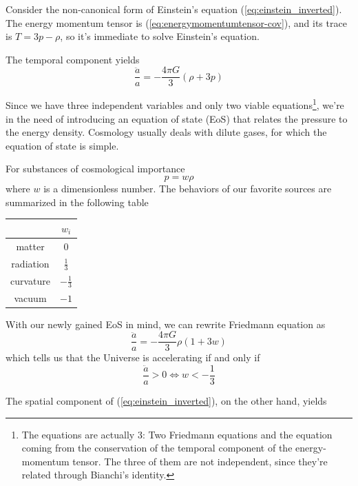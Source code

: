 Consider the non-canonical form of Einstein's equation (\ref{eq:einstein_inverted}). The energy momentum tensor is (\ref{eq:energymomentumtensor-cov}), and its trace is $T = 3p - \rho$, so it's immediate to solve Einstein's equation.
\par The temporal component yields
\begin{equation}
    \boxed{
        \frac{\ddot{a}}{a} = -\frac{4\pi G}{3}(\rho + 3p)
    }
    \label{eq:friedmann1}
\end{equation}
\par Since we have three independent variables and only two viable equations\footnote{The equations are actually 3: Two Friedmann equations and the equation coming from the conservation of the temporal component of the energy-momentum tensor. The three of them are not independent, since they're related through Bianchi's identity.}, we're in the need of introducing an equation of state (EoS) that relates the pressure to the energy density. Cosmology usually deals with dilute gases, for which the equation of state is simple.
\par For substances of cosmological importance
\begin{equation}
    p = w\rho
    \label{eq:eos}
\end{equation}
where $w$ is a dimensionless number. The behaviors of our favorite sources are summarized in the following table
\begin{table}[h!]
    \centering
    \begin{tabular}{c|c}
        & $w_{i}$ \\
        \hline
        matter & 0\\
        radiation & $\frac{1}{3}$\\
        curvature & $-\frac{1}{3}$\\
        vacuum & $-1$
    \end{tabular}
\end{table}
\par With our newly gained EoS in mind, we can rewrite Friedmann equation as
\begin{equation}
    \frac{\ddot{a}}{a} = -\frac{4\pi G}{3}\rho (1+3w)
\end{equation}
which tells us that the Universe is accelerating if and only if
\begin{equation}
    \frac{\ddot{a}}{a} > 0 \iff w < -\frac{1}{3}
\end{equation}
\par The spatial component of (\ref{eq:einstein_inverted}), on the other hand, yields

